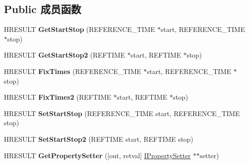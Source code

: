 \subsection*{Public 成员函数}
\begin{DoxyCompactItemize}
\item 
\mbox{\label{interface_i_a_m_timeline_obj_af96e0af2fa935e1fad5423a73a016e05}} 
H\+R\+E\+S\+U\+LT {\bfseries Get\+Start\+Stop} (R\+E\+F\+E\+R\+E\+N\+C\+E\+\_\+\+T\+I\+ME $\ast$start, R\+E\+F\+E\+R\+E\+N\+C\+E\+\_\+\+T\+I\+ME $\ast$stop)
\item 
\mbox{\label{interface_i_a_m_timeline_obj_adc165688b979c6860dfc463a7c5b7e92}} 
H\+R\+E\+S\+U\+LT {\bfseries Get\+Start\+Stop2} (R\+E\+F\+T\+I\+ME $\ast$start, R\+E\+F\+T\+I\+ME $\ast$stop)
\item 
\mbox{\label{interface_i_a_m_timeline_obj_a97c0308c77c7a3cc4947be38ec82c303}} 
H\+R\+E\+S\+U\+LT {\bfseries Fix\+Times} (R\+E\+F\+E\+R\+E\+N\+C\+E\+\_\+\+T\+I\+ME $\ast$start, R\+E\+F\+E\+R\+E\+N\+C\+E\+\_\+\+T\+I\+ME $\ast$stop)
\item 
\mbox{\label{interface_i_a_m_timeline_obj_a8feaba01be57e256db3ccaea374c8037}} 
H\+R\+E\+S\+U\+LT {\bfseries Fix\+Times2} (R\+E\+F\+T\+I\+ME $\ast$start, R\+E\+F\+T\+I\+ME $\ast$stop)
\item 
\mbox{\label{interface_i_a_m_timeline_obj_afb91dc4a3c6c3d3f14a4a5b883213225}} 
H\+R\+E\+S\+U\+LT {\bfseries Set\+Start\+Stop} (R\+E\+F\+E\+R\+E\+N\+C\+E\+\_\+\+T\+I\+ME start, R\+E\+F\+E\+R\+E\+N\+C\+E\+\_\+\+T\+I\+ME stop)
\item 
\mbox{\label{interface_i_a_m_timeline_obj_a2f12fb49def9a86f4669afdd1a2abe91}} 
H\+R\+E\+S\+U\+LT {\bfseries Set\+Start\+Stop2} (R\+E\+F\+T\+I\+ME start, R\+E\+F\+T\+I\+ME stop)
\item 
\mbox{\label{interface_i_a_m_timeline_obj_a05c77667ee5a8e94c089ec373b9127f2}} 
H\+R\+E\+S\+U\+LT {\bfseries Get\+Property\+Setter} (\mbox{[}out, retval\mbox{]} \hyperlink{interface_i_property_setter}{I\+Property\+Setter} $\ast$$\ast$setter)
\item 
$$
\end{DoxyCompactItemize}
